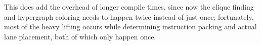 This does add the overhead of longer compile times, since now the clique finding and hypergraph coloring needs to happen twice instead of just once; fortunately, most of the heavy lifting occurs while determining instruction packing and actual lane placement, both of which only happen once.
